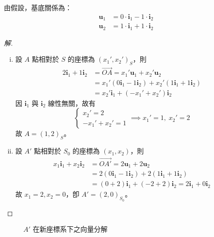 由假設，基底關係為：
\begin{align*}
\mathbf{u}_1 &= 0 \cdot \mathbf{i}_1 - 1 \cdot \mathbf{i}_2 \\
\mathbf{u}_2 &= 1 \cdot \mathbf{i}_1 + 1 \cdot \mathbf{i}_2
\end{align*}
\begin{proof}[解]
\begin{enumerate}[(i)]
  \item 設 $A$ 點相對於 $S$ 的座標為 $(x_1', x_2')_S$，則
  \begin{align*}
  2\mathbf{i}_1 + 1\mathbf{i}_2 &= \vec{OA} = x_1' \mathbf{u}_1 + x_2' \mathbf{u}_2 \\
  &= x_1'(0\mathbf{i}_1 - 1\mathbf{i}_2) + x_2'(1\mathbf{i}_1 + 1\mathbf{i}_2) \\
  &= x_2'\mathbf{i}_1 + (-x_1' + x_2')\mathbf{i}_2
  \end{align*}
  因 $\mathbf{i}_1$ 與 $\mathbf{i}_2$ 線性無關，故有
  \[ \begin{cases} x_2' = 2 \\ -x_1' + x_2' = 1 \end{cases} \implies x_1' = 1, \; x_2' = 2 \]
  故 $A = (1, 2)_S$。
  \item 設 $A'$ 點相對於 $S_0$ 的座標為 $(x_1, x_2)$，則
  \begin{align*}
  x_1\mathbf{i}_1 + x_2\mathbf{i}_2 &= \vec{OA'} = 2\mathbf{u}_1 + 2\mathbf{u}_2 \\
  &= 2(0\mathbf{i}_1 - 1\mathbf{i}_2) + 2(1\mathbf{i}_1 + 1\mathbf{i}_2) \\
  &= (0 + 2)\mathbf{i}_1 + (-2 + 2)\mathbf{i}_2 = 2\mathbf{i}_1 + 0\mathbf{i}_2
  \end{align*}
  故 $x_1 = 2, x_2 = 0$，卽 $A' = (2, 0)_{S_0}$。
\end{enumerate}
\end{proof}

\begin{figure}[H]
\centering
{}
\caption{$A'$ 在新座標系下之向量分解}
\label{fig:b4s-2-6}
\end{figure}


